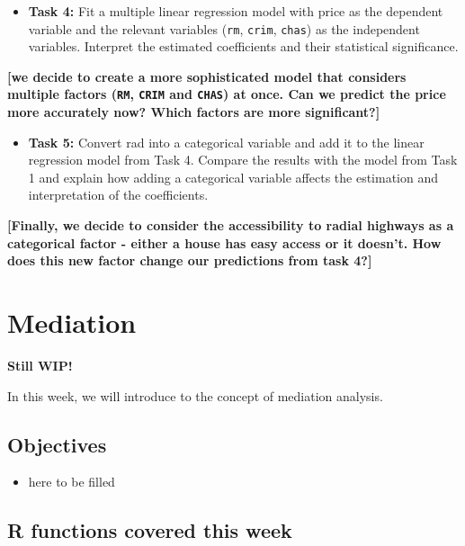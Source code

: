 \documentclass[
]{book}
\providecommand{\tightlist}{%
  \setlength{\itemsep}{0pt}\setlength{\parskip}{0pt}}
\begin{document}
\begin{itemize}
\tightlist
\item
  \textbf{Task 4:} Fit a multiple linear regression model with price as the dependent variable and the relevant variables (\texttt{rm}, \texttt{crim}, \texttt{chas}) as the independent variables. Interpret the estimated coefficients and their statistical significance.
\end{itemize}

\textbf{{[}we decide to create a more sophisticated model that considers multiple factors (\texttt{RM}, \texttt{CRIM} and \texttt{CHAS}) at once. Can we predict the price more accurately now? Which factors are more significant?{]}}

\begin{itemize}
\tightlist
\item
  \textbf{Task 5:} Convert rad into a categorical variable and add it to the linear regression model from Task 4. Compare the results with the model from Task 1 and explain how adding a categorical variable affects the estimation and interpretation of the coefficients.
\end{itemize}

\textbf{{[}Finally, we decide to consider the accessibility to radial highways as a categorical factor - either a house has easy access or it doesn't. How does this new factor change our predictions from task 4?{]}}

\hypertarget{med}{%
\chapter{Mediation}\label{med}}

\textbf{Still WIP!}

In this week, we will introduce to the concept of mediation analysis.

\hypertarget{objectives-6}{%
\section{Objectives}\label{objectives-6}}

\begin{itemize}
\tightlist
\item
  here to be filled
\end{itemize}

\hypertarget{r-functions-covered-this-week-2}{%
\section{R functions covered this week}\label{r-functions-covered-this-week-2}}
\end{document}
